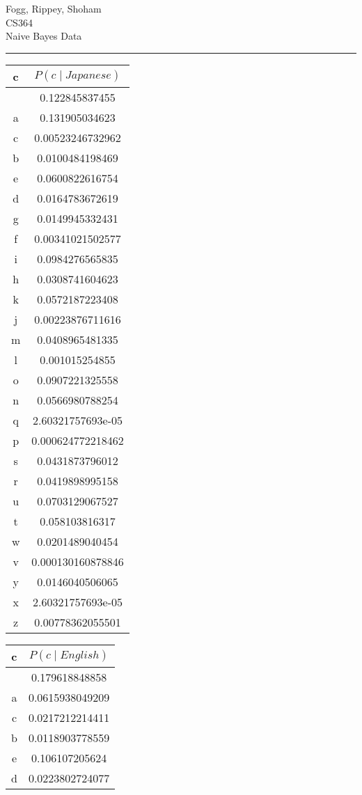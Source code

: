 \documentclass{article}
\renewcommand{\maketitle}{
  \begin{center}
    \begin{flushright}
      Fogg, Rippey, Shoham \\
      CS364 \\
      Naive Bayes Data
    \end{flushright}
    \rule{\linewidth}{0.1mm}
  \end{center}
}
\begin{document}
\maketitle\begin{center}
\begin{tabular}{c|c}
c & $P(c \mid Japanese)$ \\ \hline  & 0.122845837455 \\
a & 0.131905034623 \\
c & 0.00523246732962 \\
b & 0.0100484198469 \\
e & 0.0600822616754 \\
d & 0.0164783672619 \\
g & 0.0149945332431 \\
f & 0.00341021502577 \\
i & 0.0984276565835 \\
h & 0.0308741604623 \\
k & 0.0572187223408 \\
j & 0.00223876711616 \\
m & 0.0408965481335 \\
l & 0.001015254855 \\
o & 0.0907221325558 \\
n & 0.0566980788254 \\
q & 2.60321757693e-05 \\
p & 0.000624772218462 \\
s & 0.0431873796012 \\
r & 0.0419898995158 \\
u & 0.0703129067527 \\
t & 0.058103816317 \\
w & 0.0201489040454 \\
v & 0.000130160878846 \\
y & 0.0146040506065 \\
x & 2.60321757693e-05 \\
z & 0.00778362055501 \\
\end{tabular}
\begin{tabular}{c|c}
c & $P(c \mid English)$ \\ \hline  & 0.179618848858 \\
a & 0.0615938049209 \\
c & 0.0217212214411 \\
b & 0.0118903778559 \\
e & 0.106107205624 \\
d & 0.0223802724077 \\

\end{tabular}
\end{center}
\end{document}
